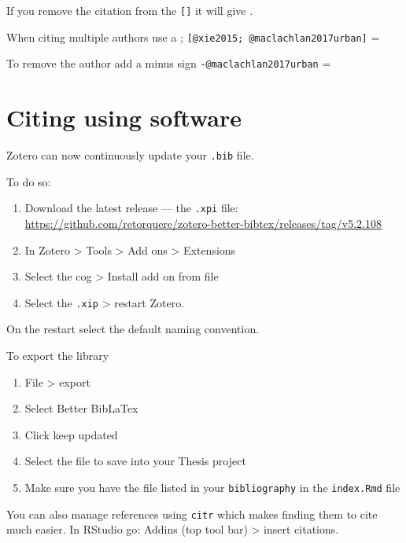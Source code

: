 \documentclass[
  12pt,
  oneside]{book}
\begin{document}
If you remove the citation from the \texttt{{[}{]}} it will give \textcite{xie2015}.

When citing multiple authors use a ; \texttt{{[}@xie2015;\ @maclachlan2017urban{]}} = \autocite{xie2015,maclachlan2017urban}

To remove the author add a minus sign \texttt{-@maclachlan2017urban} = \autocite*{maclachlan2017urban}

\hypertarget{citing-using-software}{%
\section{Citing using software}\label{citing-using-software}}

Zotero can now continuously update your \texttt{.bib} file.

To do so:

\begin{enumerate}
\def\labelenumi{\arabic{enumi}.}
\item
  Download the latest release --- the \texttt{.xpi} file: \url{https://github.com/retorquere/zotero-better-bibtex/releases/tag/v5.2.108}
\item
  In Zotero \textgreater{} Tools \textgreater{} Add ons \textgreater{} Extensions
\item
  Select the cog \textgreater{} Install add on from file
\item
  Select the \texttt{.xip} \textgreater{} restart Zotero.
\end{enumerate}

On the restart select the default naming convention.

To export the library

\begin{enumerate}
\def\labelenumi{\arabic{enumi}.}
\item
  File \textgreater{} export
\item
  Select Better BibLaTex
\item
  Click keep updated
\item
  Select the file to save into your Thesis project
\item
  Make sure you have the file listed in your \texttt{bibliography} in the \texttt{index.Rmd} file
\end{enumerate}

You can also manage references using \texttt{citr} which makes finding them to cite much easier. In RStudio go: Addins (top tool bar) \textgreater{} insert citations.
\end{document}
